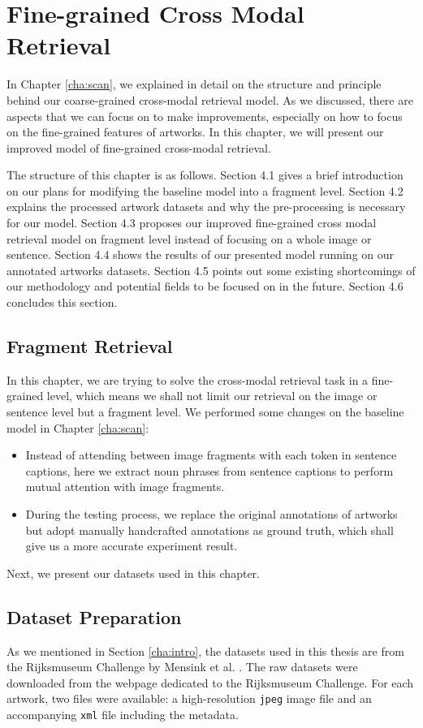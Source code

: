\chapter{Fine-grained Cross Modal Retrieval}
\label{cha:Method}

In Chapter \ref{cha:scan}, we explained in detail on the structure and principle behind our coarse-grained cross-modal retrieval model. As we discussed, there are aspects that we can focus on to make improvements, especially on how to focus on the fine-grained features of artworks. In this chapter, we will present our improved model of fine-grained cross-modal retrieval.

The structure of this chapter is as follows. Section 4.1 gives a brief introduction on our plans for modifying the baseline model into a fragment level. Section 4.2 explains the processed artwork datasets and why the pre-processing is necessary for our model. Section 4.3 proposes our improved fine-grained cross modal retrieval model on fragment level instead of focusing on a whole image or sentence. Section 4.4 shows the results of our presented model running on our annotated artworks datasets. Section 4.5 points out some existing shortcomings of our methodology and potential fields to be focused on in the future. Section 4.6 concludes this section.


\section{Fragment Retrieval}
In this chapter, we are trying to solve the cross-modal retrieval task in a fine-grained level, which means we shall not limit our retrieval on the image or sentence level but a fragment level. We performed some changes on the baseline model in Chapter \ref{cha:scan}:

\begin{itemize}
    \item Instead of attending between image fragments with each token in sentence captions, here we extract noun phrases from sentence captions to perform mutual attention with image fragments.
    \item During the testing process, we replace the original annotations of artworks but adopt manually handcrafted annotations as ground truth, which shall give us a more accurate experiment result.
\end{itemize}

Next, we present our datasets used in this chapter.

\section{Dataset Preparation}
\label{sec:dataprep}
As we mentioned in Section \ref{cha:intro}, the datasets used in this thesis are from the Rijksmuseum Challenge by Mensink et al. \cite{MensinkICMIR2014}. The raw datasets were downloaded from the webpage dedicated to the Rijksmuseum Challenge. For each artwork, two files were available: a high-resolution \verb|jpeg| image file and an accompanying \verb|xml| file including the metadata.

